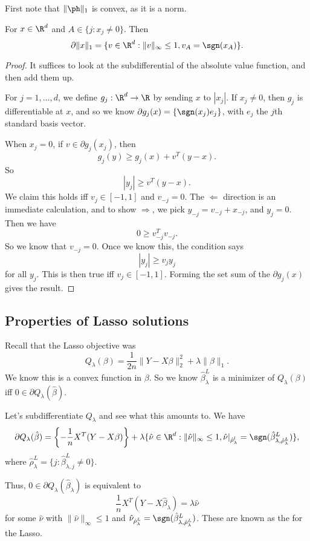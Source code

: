\documentclass[a4paper]{article}
\begin{document}
First note that $\|\ph\|_1$ is convex, as it is a norm.

\begin{prop}
  For $x \in \R^d$ and $A \in \{j: x_j \not= 0\}$. Then
  \[
    \partial \|x\|_1 = \{v \in \R^d: \|v\|_\infty \leq 1, v_A = \sgn (x_A)\}.
  \]
\end{prop}

\begin{proof}
  It suffices to look at the subdifferential of the absolute value function, and then add them up.

  For $j = 1, \ldots, d$, we define $g_j: \R^d \to \R$ by sending $x$ to $|x_j|$. If $x_j \not= 0$, then $g_j$ is differentiable at $x$, and so we know $\partial g_j (x) = \{\sgn(x_j) e_j\}$, with $e_j$ the $j$th standard basis vector.

  When $x_j = 0$, if $v \in \partial g_j(x_j)$, then
  \[
    g_j(y) \geq g_j(x) + v^T(y - x).
  \]
  So
  \[
    |y_j| \geq v^T (y - x).
  \]
  We claim this holds iff $v_j \in [-1, 1]$ and $v_{-j} = 0$. The $\Leftarrow$ direction is an immediate calculation, and to show $\Rightarrow$, we pick $y_{-j} = v_{-j} + x_{-j}$, and $y_j = 0$. Then we have
  \[
    0 \geq v_{-j}^T v_{-j}.
  \]
  So we know that $v_{-j} = 0$. Once we know this, the condition says
  \[
    |y_j| \geq v_j y_j
  \]
  for all $y_j$. This is then true iff $v_j \in [-1, 1]$. Forming the set sum of the $\partial g_j(x)$ gives the result.
\end{proof}

\subsection{Properties of Lasso solutions}
Recall that the Lasso objective was
\[
  Q_\lambda (\beta) = \frac{1}{2n} \|Y - X \beta\|_2^2 + \lambda \|\beta\|_1.
\]
We know this is a convex function in $\beta$. So we know $\hat{\beta}_\lambda^L$ is a minimizer of $Q_\lambda(\beta)$ iff $0 \in \partial Q_\lambda(\hat{\beta})$.

Let's subdifferentiate $Q_\lambda$ and see what this amounts to. We have
\[
  \partial Q_\lambda(\hat{\beta}) = \left\{-\frac{1}{n}X^T(Y - X \beta)\right\} + \lambda \{\hat{\nu} \in \R^d: \|\hat{\nu}\|_\infty \leq 1, \hat{\nu}|_{\hat{\rho}_\lambda^l} = \sgn (\hat{\beta}_{\lambda, \hat{\rho}_\lambda^L}^L)\},
\]
where $\hat{\rho}_\lambda^L = \{j : \hat{\beta}_{\lambda, j}^L \not= 0\}$. %

Thus, $0 \in \partial Q_\lambda (\hat{\beta}_\lambda)$ is equivalent to
\[
  \frac{1}{n} X^T (Y - X \hat{\beta}_\lambda) = \lambda \hat{\nu}
\]
for some $\hat{\nu}$ with $\|\hat{\nu}\|_{\infty} \leq 1$ and $\hat{\nu}_{\hat{\rho}_\lambda^L} = \sgn (\hat{\beta}_{\lambda, \hat{\rho}^L_\lambda}^L)$. These are known as the  for the Lasso.
\end{document}
